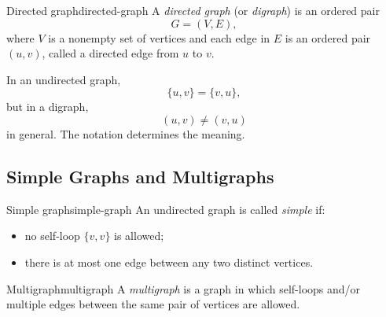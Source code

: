 \begin{definition}{Directed graph}{directed-graph}
A \emph{directed graph} (or \emph{digraph}) is an ordered pair
\[
G=(V,E),
\]
where \(V\) is a nonempty set of vertices and each edge in \(E\) is an ordered pair \((u,v)\), called a directed edge from \(u\) to \(v\).
\end{definition}

\begin{center}
\end{center}

\begin{commonmistake}[title={Ordered pair versus unordered pair}]
In an undirected graph,
\[
\{u,v\}=\{v,u\},
\]
but in a digraph,
\[
(u,v)\neq (v,u)
\]
in general. The notation determines the meaning.
\end{commonmistake}

\subsection{Simple Graphs and Multigraphs}

\begin{definition}{Simple graph}{simple-graph}
An undirected graph is called \emph{simple} if:
\begin{itemize}[leftmargin=*]
    \item no self-loop \(\{v,v\}\) is allowed;
    \item there is at most one edge between any two distinct vertices.
\end{itemize}
\end{definition}

\begin{definition}{Multigraph}{multigraph}
A \emph{multigraph} is a graph in which self-loops and/or multiple edges between the same pair of vertices are allowed.
\end{definition}

